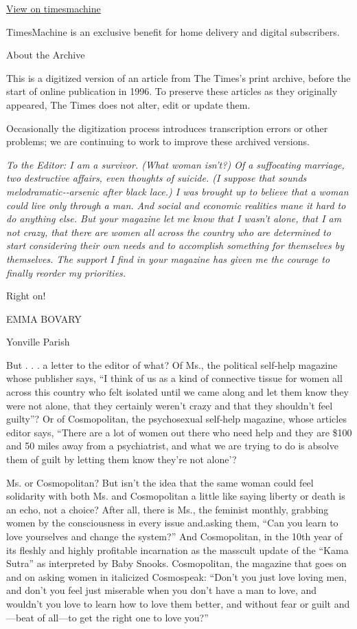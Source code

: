 \href{http://timesmachine.nytimes3xbfgragh.onion/timesmachine/1974/08/11/99178554.html}{View
on timesmachine}

TimesMachine is an exclusive benefit for home delivery and digital
subscribers.

About the Archive

This is a digitized version of an article from The Times's print
archive, before the start of online publication in 1996. To preserve
these articles as they originally appeared, The Times does not alter,
edit or update them.

Occasionally the digitization process introduces transcription errors or
other problems; we are continuing to work to improve these archived
versions.

\emph{To the Editor: I am a survivor. (What woman isn't?) Of a
suffocating marriage, two destructive affairs, even thoughts of suicide.
(I suppose that sounds melodramatic‐‐arsenic after black lace.) I was
brought up to believe that a woman could live only through a man. And
social and economic realities mane it hard to do anything else. But your
magazine let me know that I wasn't alone, that I am not crazy, that
there are women all across the country who are determined to start
considering their own needs and to accomplish something for themselves
by themselves. The support I find in your magazine has given me the
courage to finally reorder my priorities.}

Right on!

EMMA BOVARY

Yonville Parish

But . . . a letter to the editor of what? Of Ms., the political
self‐help magazine whose publisher says, ``I think of us as a kind of
connective tissue for women all across this country who felt isolated
until we came along and let them know they were not alone, that they
certainly weren't crazy and that they shouldn't feel guilty''? Or of
Cosmopolitan, the psychosexual self‐help magazine, whose articles editor
says, ``There are a lot of women out there who need help and they are
\$100 and 50 miles away from a psychiatrist, and what we are trying to
do is absolve them of guilt by letting them know they're not alone'?

Ms. or Cosmopolitan? But isn't the idea that the same woman could feel
solidarity with both Ms. and Cosmopolitan a little like saying liberty
or death is an echo, not a choice? After all, there is Ms., the feminist
monthly, grabbing women by the consciousness in every issue and.asking
them, ``Can you learn to love yourselves and change the system?'' And
Cosmopolitan, in the 10th year of its fleshly and highly profitable
incarnation as the masscult update of the ``Kama Sutra'' as interpreted
by Baby Snooks. Cosmopolitan, the magazine that goes on and on asking
women in italicized Cosmospeak: ``Don't you just love loving men, and
don't you feel just miserable when you don't have a man to love, and
wouldn't you love to learn how to love them better, and without fear or
guilt and---beat of all---to get the right one to love you?''

